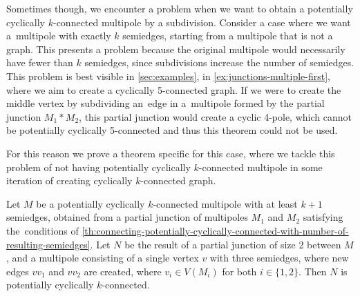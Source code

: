 \documentclass[12pt, twoside]{book}
\begin{document}
Sometimes though, we encounter a problem when we want to obtain a potentially cyclically $k$-connected multipole by a subdivision. Consider a case where we want a~multipole with exactly $k$ semiedges, starting from a multipole that is not a graph. This presents a problem because the original multipole would necessarily have fewer than $k$ semiedges, since subdivisions increase the number of semiedges. This problem is best visible in \cref{sec:examples}, in \cref{ex:junctions-multiple-first}, where we aim to create a cyclically 5-connected graph. If we were to create the middle vertex by subdividing an~edge in a~multipole formed by the partial junction $M_1*M_2$, this partial junction would create a cyclic 4-pole, which cannot be potentially cyclically 5-connected and thus this theorem could not be used.

For this reason we prove a theorem specific for this case, where we tackle this problem of not having potentially cyclically $k$-connected multipole in some iteration of creating cyclically $k$-connected graph.

\begin{lemma}\label{lem:adding-point-to-partial-junction-of-two}
	Let $M$ be a potentially cyclically $k$-connected multipole with at least $k+1$ semiedges, obtained from a partial junction of multipoles $M_1$ and $M_2$ satisfying the~conditions of \cref{th:connecting-potentially-cyclically-connected-with-number-of-resulting-semiedges}. Let $N$ be the result of a partial junction of size 2 between $M$, and a multipole consisting of a single vertex $v$ with three semiedges, where new edges $vv_1$ and $vv_2$ are created, where $v_i\in V(M_i)$ for both $i\in\{1,2\}$. Then $N$ is potentially cyclically $k$-connected.
\end{lemma}
\end{document}
